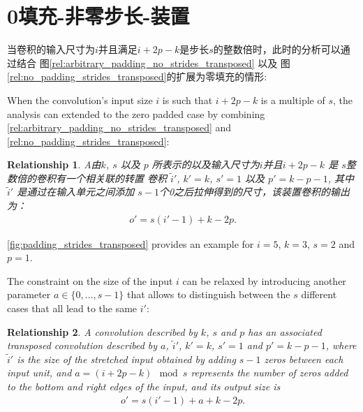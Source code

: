 \documentclass[notitlepage]{report}
\newtheorem{relationship}{Relationship}
\begin{document}
\section{0填充-非零步长-装置}

当卷积的输入尺寸为$i$并且满足$i + 2p - k$是步长$s$的整数倍时，此时的分析可以通过结合
图\autoref{rel:arbitrary_padding_no_strides_transposed} 以及
图\autoref{rel:no_padding_strides_transposed}的扩展为零填充的情形:

When the convolution's input size $i$ is such that $i + 2p - k$ is a multiple
of $s$, the analysis can extended to the zero padded case by combining
\autoref{rel:arbitrary_padding_no_strides_transposed} and
\autoref{rel:no_padding_strides_transposed}:


\begin{relationship}\label{rel:padding_strides_transposed}
A由$k$, $s$ 以及 $p$ 所表示的以及输入尺寸为$i$并且$i + 2p - k$ 是 $s$整数倍的卷积有一个相关联的转置
卷积 $\tilde{i}'$, $k' = k$, $s' = 1$ 以及
$p' = k - p - 1$, 其中 $\tilde{i}'$ 是通过在输入单元之间添加
$s - 1$个0之后拉伸得到的尺寸，该装置卷积的输出为：
\begin{equation*}
\begin{split}
    o' = s (i' - 1) + k - 2p.
\end{split}
\end{equation*}
\end{relationship}

\autoref{fig:padding_strides_transposed} provides an example for $i = 5$, $k =
3$, $s = 2$ and $p = 1$.



The constraint on the size of the input $i$ can be relaxed by introducing
another parameter $a \in \{0, \ldots, s - 1\}$ that allows to distinguish
between the $s$ different cases that all lead to the same $i'$:

\begin{relationship}\label{rel:padding_strides_transposed_odd}
A convolution described by $k$, $s$ and $p$ has an
associated transposed convolution described by $a$, $\tilde{i}'$, $k' = k$, $s'
= 1$ and $p' = k - p - 1$, where $\tilde{i}'$ is the size of the stretched
input obtained by adding $s - 1$ zeros between each input unit, and $a = (i +
2p - k) \mod s$ represents the number of zeros added to the bottom and right edges
of the input, and its output size is
\begin{equation*}
\begin{split}
    o' = s (i' - 1) + a + k - 2p.
\end{split}
\end{equation*}
\end{relationship}
\end{document}
